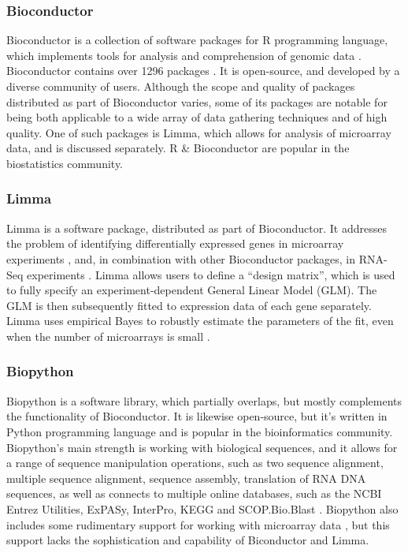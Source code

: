 \subsubsection{Bioconductor}

Bioconductor is a collection of software packages for R programming language, which implements tools for analysis and comprehension of genomic data \parencite{Huber2017}. Bioconductor contains over 1296 packages \parencite{Bioconductor}. It is open-source, and developed by a diverse community of users. Although the scope and quality of packages distributed as part of Bioconductor varies, some of its packages are notable for being both applicable to a wide array of data gathering techniques and of high quality. One of such packages is Limma, which allows for analysis of microarray data, and is discussed separately. R \& Bioconductor are popular in the biostatistics community.

\subsubsection{Limma}

Limma is a software package, distributed as part of Bioconductor. It addresses the problem of identifying differentially expressed genes in microarray experiments \parencite{Smyth2004}, and, in combination with other Bioconductor packages, in RNA-Seq experiments \parencite{Law2016}. Limma allows users to define a ``design matrix'', which is used to fully specify an experiment-dependent General Linear Model (GLM). The GLM is then subsequently fitted to expression data of each gene separately. Limma uses empirical Bayes to robustly estimate the parameters of the fit, even when the number of microarrays is small \parencite{Smyth2004}.

\subsubsection{Biopython}

Biopython is a software library, which partially overlaps, but mostly complements the functionality of Bioconductor. It is likewise open-source, but it's written in Python programming language and is popular in the bioinformatics community. Biopython's main strength is working with biological sequences, and it allows for a range of sequence manipulation operations, such as two sequence alignment, multiple sequence alignment, sequence assembly, translation of RNA  DNA sequences, as well as connects to multiple online databases, such as the NCBI Entrez Utilities, ExPASy, InterPro, KEGG and SCOP.Bio.Blast \parencite{Cock2009}. Biopython also includes some rudimentary support for working with microarray data \parencite{Zuzan2004,Kurkiewicz2016}, but this support lacks the sophistication and capability of Biconductor and Limma.

